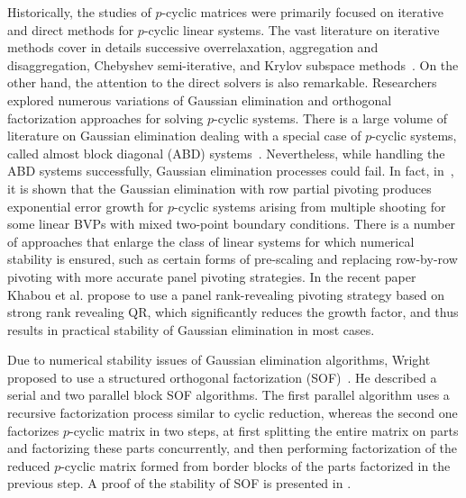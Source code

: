 \documentclass{llncs}
\newcommand{\editDel}[1]{}
\begin{document}
Historically, the studies of $p$-cyclic matrices
were primarily focused on iterative and direct methods for 
$p$-cyclic linear systems. The vast literature on iterative methods 
cover in details successive overrelaxation,
aggregation and disaggregation,
Chebyshev semi-iterative, 
and Krylov subspace methods~\cite{Ernst00}.
On the other hand, the attention to the direct solvers 
is also remarkable.
Researchers explored numerous variations of Gaussian elimination and 
orthogonal factorization approaches for solving $p$-cyclic systems.
There is a large volume of literature on Gaussian elimination
dealing with a special case of $p$-cyclic systems, 
called almost block diagonal (ABD) systems~\cite{Wright92BSOF}.
Nevertheless, while 
handling %
the ABD systems successfully, 
Gaussian elimination processes could fail.
In fact, in~\cite{Wright93}, it is shown that 
the Gaussian elimination with row partial pivoting %
produces exponential error growth
for $p$-cyclic systems arising from multiple shooting for 
some linear BVPs with mixed two-point boundary conditions. 
There is a number of approaches that enlarge the class of linear systems
for which numerical stability is ensured, 
such as certain forms of pre-scaling
and replacing row-by-row pivoting with 
more accurate panel pivoting strategies.
In the recent paper~\cite{KhabouDGG13} Khabou et al.
propose to use a panel rank-revealing pivoting strategy 
based on strong rank revealing QR, 
which significantly reduces the growth factor, and 
thus results in practical stability of Gaussian elimination
in most cases.

Due to numerical stability issues of Gaussian elimination algorithms, 
Wright proposed to use a structured orthogonal 
factorization (SOF)~\cite{Wright92BSOF}.
He described a serial and two parallel block SOF algorithms. 
The first parallel algorithm uses a recursive factorization 
process similar to cyclic reduction,
whereas the second one factorizes $p$-cyclic matrix in two steps,
at first splitting the entire matrix on parts and factorizing these 
parts concurrently, and then performing factorization of the reduced 
$p$-cyclic matrix formed from border blocks of the parts factorized 
in the previous step.  A proof of the stability of 
SOF is presented in \cite{Wright92BSOF}.
\end{document}
